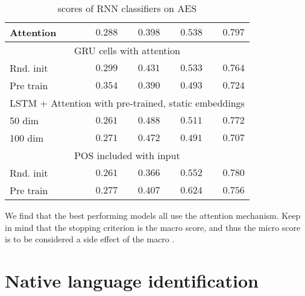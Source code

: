 \begin{table}
\begin{tabular}{lrrrr}
    Attention &         $0.288$  &         $0.398$  &         $0.538$  &         $0.797$  \\
    \midrule
              \multicolumn{5}{c}{GRU cells with attention} \\
    \midrule
    Rnd. init &         $0.299$  &         $0.431$  &         $0.533$  &         $0.764$  \\
    Pre train & $\mathbf{0.354}$ &         $0.390$  &         $0.493$  &         $0.724$  \\
    \midrule
              \multicolumn{5}{c}{LSTM + Attention with pre-trained, static embeddings} \\
    \midrule
    50 dim    &         $0.261$  & $\mathbf{0.488}$ &         $0.511$  &         $0.772$  \\
    100 dim   &         $0.271$  &         $0.472$  &         $0.491$  &         $0.707$  \\
    \midrule
              \multicolumn{5}{c}{POS included with input} \\
    \midrule
    Rnd. init &         $0.261$  &         $0.366$  &         $0.552$  &         $0.780$  \\
    Pre train &         $0.277$  &         $0.407$  & $\mathbf{0.624}$ &         $0.756$  \\
    \bottomrule
  \end{tabular}
  \caption{\FI scores of RNN classifiers on AES}
  \label{tab:rnn-results}
\end{table}

We find that the best performing models all use the attention mechanism.
Keep in mind that the stopping criterion is the macro \FI score, and thus
the micro \FI score is to be considered a side effect of the macro \FI.



\section{Native language identification}

